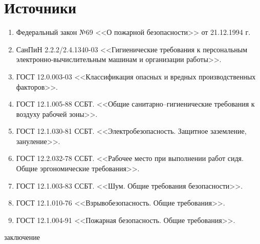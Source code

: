 \documentclass[utf8,usehyperref,12pt]{G7-32}
\begin{document}
\section{Источники}
\begin{enumerate}
\item Федеральный закон №69 <<О пожарной безопасности>> от 21.12.1994 г.
\item СанПиН 2.2.2/2.4.1340-03 <<Гигиенические требования к персональным электронно-вычислительным машинам и организации работы>>.
\item ГОСТ 12.0.003-03 <<Классификация опасных и вредных производственных факторов>>.
\item ГОСТ 12.1.005-88 ССБТ. <<Общие санитарно–гигиенические требования к воздуху рабочей зоны>>.
\item ГОСТ 12.1.030-81 ССБТ. <<Электробезопасность. Защитное заземление, зануление>>.
\item ГОСТ 12.2.032-78 ССБТ. <<Рабочее место при выполнении работ сидя. Общие эргономические требования>>.
\item ГОСТ 12.1.003-83 ССБТ. <<Шум. Общие требования безопасности>>.
\item ГОСТ 12.1.010-76 <<Взрывобезопасность. Общие требования>>.
\item ГОСТ 12.1.004-91 <<Пожарная безопасность. Общие требования>>.
\end{enumerate}

\Conclusion
заключение
\end{document}
